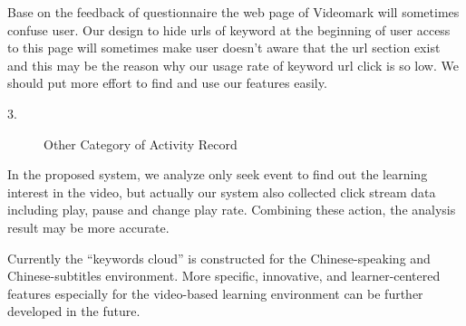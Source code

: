 Base on the feedback of questionnaire the web page of Videomark will sometimes confuse user.
Our design to hide urls of keyword at the beginning of user access to this page will sometimes make user doesn't aware that the url section exist and this may be the reason why our usage rate of keyword url click is so low.
We should put more effort to find and use our features easily.

\begin{description}
  \item[3.] Other Category of Activity Record
\end{description}

In the proposed system, we analyze only seek event to find out the learning interest in the video, but actually our system also collected click stream data including play, pause and change play rate.
Combining these action, the analysis result may be more accurate.

Currently the “keywords cloud” is constructed for the Chinese-speaking and Chinese-subtitles environment.
More specific, innovative, and learner-centered features especially for the video-based learning environment can be further developed in the future.
